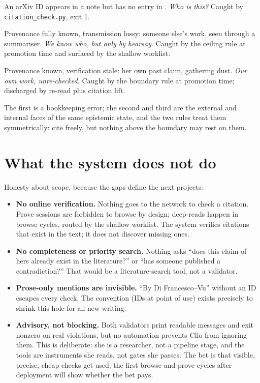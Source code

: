 \documentclass[11pt,a4paper]{article}
\newcommand{\level}[1]{\texttt{#1}}
\begin{document}
\begin{description}[nosep]
  \item[Unregistered.] An arXiv ID appears in a note but has no entry in
    . \emph{Who is this?} Caught by
    \texttt{citation\_check.py}, exit 1.
  \item[\level{agent-summary}.] Provenance fully known, transmission lossy:
    someone else's work, seen through a summariser. \emph{We know who, but
    only by hearsay.} Caught by the ceiling rule at promotion time and
    surfaced by the shallow worklist.
  \item[\level{unclassified}.] Provenance known, verification stale: her own
    past claim, gathering dust. \emph{Our own work, unre-checked.} Caught by
    the boundary rule at promotion time; discharged by re-read plus citation
    lift.
\end{description}

The first is a bookkeeping error; the second and third are the external and
internal faces of the same epistemic state, and the two rules treat them
symmetrically: cite freely, but nothing above the boundary may rest on them.

\section{What the system does not do}

Honesty about scope, because the gaps define the next projects:

\begin{itemize}[nosep]
  \item \textbf{No online verification.} Nothing goes to the network to
    check a citation. Prove sessions are forbidden to browse by design;
    deep-reads happen in browse cycles, routed by the shallow worklist. The
    system verifies citations that exist in the text; it does not discover
    missing ones.
  \item \textbf{No completeness or priority search.} Nothing asks ``does
    this claim of hers already exist in the literature?'' or ``has someone
    published a contradiction?'' That would be a literature-search tool, not
    a validator.
  \item \textbf{Prose-only mentions are invisible.} ``By Di Francesco--Vu''
    without an ID escapes every check. The convention (IDs at point of use)
    exists precisely to shrink this hole for all new writing.
  \item \textbf{Advisory, not blocking.} Both validators print readable
    messages and exit nonzero on real violations, but no automation prevents
    Clio from ignoring them. This is deliberate: she is a researcher, not a
    pipeline stage, and the tools are instruments she reads, not gates she
    passes. The bet is that visible, precise, cheap checks get used; the
    first browse and prove cycles after deployment will show whether the bet
    pays.
\end{itemize}
\end{document}
